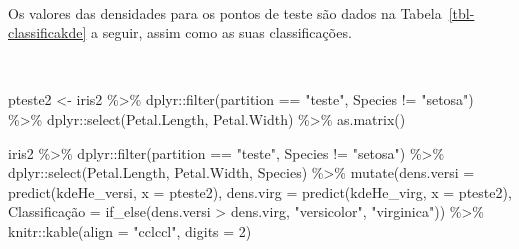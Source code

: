 \documentclass[
  a4paperpaper,
]{article}
\newenvironment{Shaded}{\begin{snugshade}}{\end{snugshade}}
\newcommand{\AttributeTok}[1]{\textcolor[rgb]{0.40,0.45,0.13}{#1}}
\newcommand{\DecValTok}[1]{\textcolor[rgb]{0.68,0.00,0.00}{#1}}
\newcommand{\FunctionTok}[1]{\textcolor[rgb]{0.28,0.35,0.67}{#1}}
\newcommand{\NormalTok}[1]{\textcolor[rgb]{0.00,0.23,0.31}{#1}}
\newcommand{\OtherTok}[1]{\textcolor[rgb]{0.00,0.23,0.31}{#1}}
\newcommand{\SpecialCharTok}[1]{\textcolor[rgb]{0.37,0.37,0.37}{#1}}
\newcommand{\StringTok}[1]{\textcolor[rgb]{0.13,0.47,0.30}{#1}}
\begin{document}
~

Os valores das densidades para os pontos de teste são dados na
Tabela~\ref{tbl-classificakde} a seguir, assim como as suas
classificações.

~

\begin{Shaded}
\begin{Highlighting}[]
\NormalTok{pteste2 }\OtherTok{\textless{}{-}}\NormalTok{ iris2 }\SpecialCharTok{\%\textgreater{}\%} 
\NormalTok{  dplyr}\SpecialCharTok{::}\FunctionTok{filter}\NormalTok{(partition }\SpecialCharTok{==} \StringTok{"teste"}\NormalTok{, Species }\SpecialCharTok{!=} \StringTok{"setosa"}\NormalTok{) }\SpecialCharTok{\%\textgreater{}\%}
\NormalTok{  dplyr}\SpecialCharTok{::}\FunctionTok{select}\NormalTok{(Petal.Length, Petal.Width) }\SpecialCharTok{\%\textgreater{}\%}
  \FunctionTok{as.matrix}\NormalTok{()}

\NormalTok{iris2 }\SpecialCharTok{\%\textgreater{}\%} 
\NormalTok{  dplyr}\SpecialCharTok{::}\FunctionTok{filter}\NormalTok{(partition }\SpecialCharTok{==} \StringTok{"teste"}\NormalTok{, Species }\SpecialCharTok{!=} \StringTok{"setosa"}\NormalTok{) }\SpecialCharTok{\%\textgreater{}\%}
\NormalTok{  dplyr}\SpecialCharTok{::}\FunctionTok{select}\NormalTok{(Petal.Length, Petal.Width, Species) }\SpecialCharTok{\%\textgreater{}\%}
  \FunctionTok{mutate}\NormalTok{(}\AttributeTok{dens.versi =} \FunctionTok{predict}\NormalTok{(kdeHe\_versi, }\AttributeTok{x =}\NormalTok{ pteste2),}
         \AttributeTok{dens.virg =} \FunctionTok{predict}\NormalTok{(kdeHe\_virg, }\AttributeTok{x =}\NormalTok{ pteste2),}
         \StringTok{\textasciigrave{}}\AttributeTok{Classificação}\StringTok{\textasciigrave{}} \OtherTok{=} \FunctionTok{if\_else}\NormalTok{(dens.versi }\SpecialCharTok{\textgreater{}}\NormalTok{ dens.virg, }\StringTok{"versicolor"}\NormalTok{, }\StringTok{"virginica"}\NormalTok{)) }\SpecialCharTok{\%\textgreater{}\%}
\NormalTok{  knitr}\SpecialCharTok{::}\FunctionTok{kable}\NormalTok{(}\AttributeTok{align =} \StringTok{"cclccl"}\NormalTok{,}
               \AttributeTok{digits =} \DecValTok{2}\NormalTok{)}
\end{Highlighting}
\end{Shaded}
\end{document}
